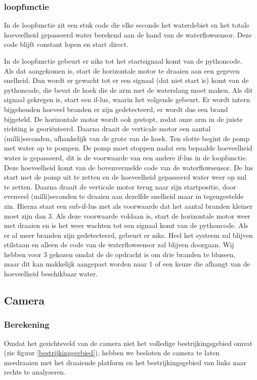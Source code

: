\documentclass[kulak]{kulakarticle} %
\begin{document}
		\subsubsection{loopfunctie}
		
		In de loopfunctie zit een stuk code die elke seconde het waterdebiet en het totale hoeveelheid gepasseerd water berekend aan de hand van de waterflowsensor. Deze code blijft constant lopen en start direct.
		
		In de loopfunctie gebeurt er niks tot het startsignaal komt van de pythoncode. Als dat aangekomen is, start de horizontale motor te draaien aan een gegeven snelheid. Dan wordt er gewacht tot er een signaal (dat niet start is) komt van de pythoncode, die bevat de hoek die de arm met de waterslang moet maken. Als dit signaal gekregen is, start een if-lus, waarin het volgende gebeurt. Er wordt intern bijgehouden hoeveel branden er zijn gedetecteerd, er wordt dus een brand bijgeteld. De horizontale motor wordt ook gestopt, zodat onze arm in de juiste richting is georiënteerd. Daarna draait de verticale motor een aantal (milli)seconden, afhankelijk van de grote van de hoek. Ten slotte begint de pomp met water op te pompen.
		De pomp moet stoppen nadat een bepaalde hoeveelheid water is gepasseerd, dit is de voorwaarde van een andere if-lus in de loopfunctie. Deze hoeveelheid komt van de bovenvermelde code van de waterflowsensor. De lus start met de pomp uit te zetten en de hoeveelheid gepasseerd water weer op nul te zetten. Daarna draait de verticale motor terug naar zijn startpositie, door evenveel (milli)seconden te draaien aan dezelfde snelheid maar in tegengestelde zin. Hierna staat een sub-if-lus met als voorwaarde dat het aantal branden kleiner moet zijn dan 3. Als deze voorwaarde voldaan is, start de horizontale motor weer met draaien en is het weer wachten tot een signaal komt van de pythoncode. Als er al meer branden zijn gedetecteerd, gebeurt er niks. Heel het systeem zal blijven stilstaan en alleen de code van de waterflowsensor zal blijven doorgaan. Wij hebben voor 3 gekozen omdat de de opdracht is om drie branden te blussen, maar dit kan makkelijk aangepast worden naar 1 of een keuze die afhangt van de hoeveelheid beschikbaar water.     
		

	\subsection{Camera}
		\subsubsection{Berekening}
			Omdat het gezichtsveld van de camera niet het volledige bestrijkingsgebied omvat (zie figuur \ref{bestrijkingsgebied}), hebben we besloten de camera te laten meedraaien met het draaiende platform en het bestrijkingsgebied van links naar rechts te analyseren. \\
\end{document}
